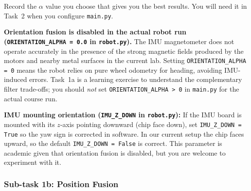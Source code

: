 \documentclass[12pt,letterpaper]{article}
\begin{document}

\begin{notebox}
  Record the $\alpha$ value you choose that gives you the best results. You will need it in Task~2 when you
  configure \texttt{main.py}.
\end{notebox}

\begin{warningbox}
  \textbf{Orientation fusion is disabled in the actual robot run
  (\texttt{ORIENTATION\_ALPHA = 0.0} in \texttt{robot.py}).}
  The IMU magnetometer does not operate accurately in the presence of the
  strong magnetic fields produced by the motors and nearby metal surfaces in
  the current lab.  Setting \texttt{ORIENTATION\_ALPHA = 0} means the robot
  relies on pure wheel odometry for heading, avoiding IMU-induced errors.
  Task~1a is a learning exercise to understand the complementary filter
  trade-offs; you should \emph{not} set \texttt{ORIENTATION\_ALPHA > 0} in
  \texttt{main.py} for the actual course run.
\end{warningbox}

\begin{notebox}
  \textbf{IMU mounting orientation (\texttt{IMU\_Z\_DOWN} in
  \texttt{robot.py}):} If the IMU board is mounted with its $z$-axis pointing
  downward (chip face down), set \texttt{IMU\_Z\_DOWN = True} so the yaw sign
  is corrected in software.  In our current setup the chip faces upward, so
  the default \texttt{IMU\_Z\_DOWN = False} is correct.  This parameter is
  academic given that orientation fusion is disabled, but you are welcome to
  experiment with it.
\end{notebox}

\subsubsection{Sub-task 1b: Position Fusion}
\end{document}
